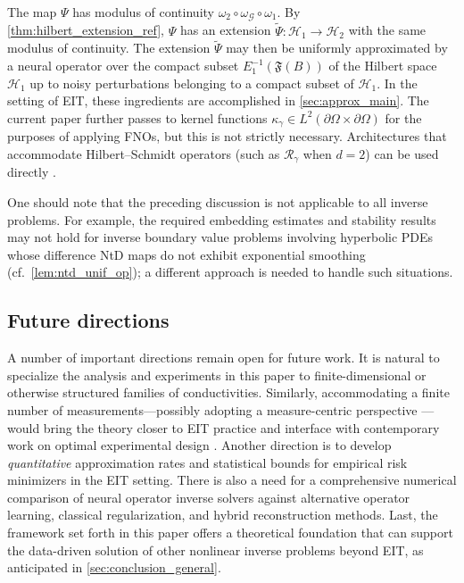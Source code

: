 \documentclass[pdflatex,sn-mathphys-num]{sn-jnl-preprint}
\newcommand{\cH}{\mathcal{H}}
\newcommand{\cG}{\mathcal{G}}
\newcommand{\pOmega}{{\partial\Omega}}
\newcommand{\ntd}{\mathscr{R}_{\gamma}}
\theoremstyle{thmstyleone}%
\theoremstyle{thmstyletwo}%
\theoremstyle{thmstylethree}%
\numberwithin{equation}{section}
\numberwithin{theorem}{section}
\begin{document}
The map $\Psi$ has modulus of continuity $\omega_2\circ \omega_\cG\circ \omega_1$. By \cref{thm:hilbert_extension_ref}, $\Psi$ has an extension $\widetilde{\Psi}\colon \cH_1\to \cH_2$ with the same modulus of continuity. The extension $\widetilde{\Psi}$ may then be uniformly approximated by a neural operator over the compact subset $E_1^{-1}(\mathfrak{F}(B))$ of the Hilbert space $\cH_1$ up to noisy perturbations belonging to a compact subset of $\cH_1$. In the setting of EIT, these ingredients are accomplished in \cref{sec:approx_main}. The current paper further passes to kernel functions $\kappa_\gamma\in L^2(\pOmega\times\pOmega)$ for the purposes of applying FNOs, but this is not strictly necessary. Architectures that accommodate Hilbert--Schmidt operators (such as $\ntd$ when $d=2$) can be used directly \cite{de2019deep}.

One should note that the preceding discussion is not applicable to all inverse problems. For example, the required embedding estimates and stability results may not hold for inverse boundary value problems involving hyperbolic PDEs whose difference NtD maps do not exhibit exponential smoothing (cf.~\cref{lem:ntd_unif_op}); a different approach is needed to handle such situations.


\subsection{Future directions}\label{sec:conclusion_future}
A number of important directions remain open for future work. It is natural to specialize the analysis and experiments in this paper to finite-dimensional \cite{alberti2022infinite} or otherwise structured \cite{garde2025infinite} families of conductivities. Similarly, accommodating a finite number of measurements---possibly adopting a measure-centric perspective \cite{nelsen2025operator}---would bring the theory closer to EIT practice and interface with contemporary work on optimal experimental design \cite{bui2022bridging,guerra2025learning,huan2024optimal,jin2024optimal,jin2024continuous}. Another direction is to develop \emph{quantitative} approximation rates \cite{kratsios2024mixture} and statistical bounds for empirical risk minimizers \cite{de2019deep,kovachki2024data,lanthaler2023error} in the EIT setting. There is also a need for a comprehensive numerical comparison of neural operator inverse solvers against alternative operator learning, classical regularization, and hybrid reconstruction methods.
Last, the framework set forth in this paper offers a theoretical foundation that can support the data-driven solution of other nonlinear inverse problems beyond EIT, as anticipated in \cref{sec:conclusion_general}.
\end{document}
